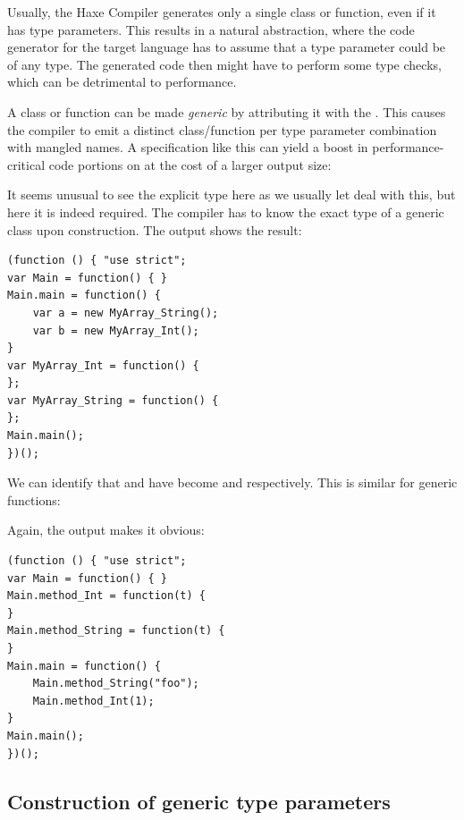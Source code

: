 \documentclass{haxe}
\begin{document}
Usually, the Haxe Compiler generates only a single class or function, even if it has type parameters. This results in a natural abstraction, where the code generator for the target language has to assume that a type parameter could be of any type. The generated code then might have to perform some type checks, which can be detrimental to performance.

A class or function can be made \emph{generic} by attributing it with the  . This causes the compiler to emit a distinct class/function per type parameter combination with mangled names. A specification like this can yield a boost in performance-critical code portions on  at the cost of a larger output size:


It seems unusual to see the explicit type  here as we usually let  deal with this, but here it is indeed required. The compiler has to know the exact type of a generic class upon construction. The  output shows the result:

\begin{lstlisting}
(function () { "use strict";
var Main = function() { }
Main.main = function() {
	var a = new MyArray_String();
	var b = new MyArray_Int();
}
var MyArray_Int = function() {
};
var MyArray_String = function() {
};
Main.main();
})();
\end{lstlisting}

We can identify that  and  have become  and  respectively. This is similar for generic functions:


Again, the  output makes it obvious:

\begin{lstlisting}
(function () { "use strict";
var Main = function() { }
Main.method_Int = function(t) {
}
Main.method_String = function(t) {
}
Main.main = function() {
	Main.method_String("foo");
	Main.method_Int(1);
}
Main.main();
})();
\end{lstlisting}


\subsection{Construction of generic type parameters}
\label{type-system-generic-type-parameter-construction}
\end{document}

